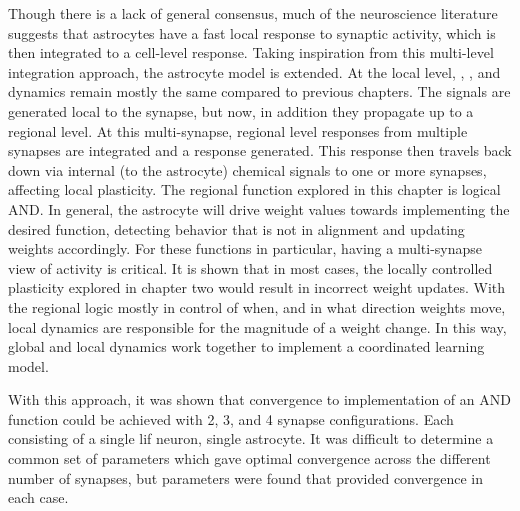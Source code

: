Though there is a lack of general consensus, much of the neuroscience literature
suggests that astrocytes have a fast local response to synaptic activity, which
is then integrated to a cell-level response. Taking inspiration from this
multi-level integration approach, the astrocyte model is extended. At the local
level, \ipt, \kp, and \ca dynamics remain mostly the same compared to previous
chapters. The \ca signals are generated local to the synapse, but now, in
addition they propagate up to a regional level. At this multi-synapse, regional
level \ca responses from multiple synapses are integrated and a response
generated. This response then travels back down via internal (to the astrocyte)
chemical signals to one or more synapses, affecting local plasticity. The
regional function explored in this chapter is logical AND. In general, the
astrocyte will drive weight values towards implementing the desired function,
detecting behavior that is not in alignment and updating weights
accordingly. For these functions in particular, having a multi-synapse view of
activity is critical. It is shown that in most cases, the locally controlled
plasticity explored in chapter two would result in incorrect weight
updates. With the regional logic mostly in control of when, and in what
direction weights move, local dynamics are responsible for the magnitude of a
weight change. In this way, global and local dynamics work together to implement
a coordinated learning model.

With this approach, it was shown that convergence to implementation of an AND
function could be achieved with 2, 3, and 4 synapse configurations. Each
consisting of a single \gls{lif} neuron, single astrocyte. It was difficult to
determine a common set of parameters which gave optimal convergence across the
different number of synapses, but parameters were found that provided
convergence in each case.
